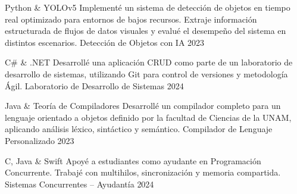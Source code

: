 \begin{cvhonors}

  \cvhonor
    {Python \& YOLOv5}
    {Implementé un sistema de detección de objetos en tiempo real optimizado para entornos de bajos recursos. Extraje información estructurada de flujos de datos visuales y evalué el desempeño del sistema en distintos escenarios.}
    {Detección de Objetos con IA}
    {2023}

  \cvhonor
    {C\# \& .NET}
    {Desarrollé una aplicación CRUD como parte de un laboratorio de desarrollo de sistemas, utilizando Git para control de versiones y metodología Ágil.}
    {Laboratorio de Desarrollo de Sistemas}
    {2024}

  \cvhonor
    {Java \& Teoría de Compiladores}
    {Desarrollé un compilador completo para un lenguaje orientado a objetos definido por la facultad de Ciencias de la UNAM, aplicando análisis léxico, sintáctico y semántico.}
    {Compilador de Lenguaje Personalizado}
    {2023}

  \cvhonor
    {C, Java \& Swift}
    {Apoyé a estudiantes como ayudante en Programación Concurrente. Trabajé con multihilos, sincronización y memoria compartida.}
    {Sistemas Concurrentes – Ayudantía}
    {2024}

\end{cvhonors}
